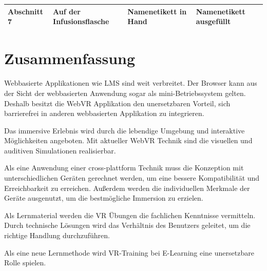 \begin{table}[]
{\begin{tabular}{llll}
Abschnitt 7 & Auf der Infusionsflasche                                                         & Namenetikett in Hand                                                                                     & Namenetikett ausgefüllt                                                                                  \\ \hline
\end{tabular}
}
\label{tab:HinweisBox}
\end{table}

  
\section{Zusammenfassung}
Webbasierte Applikationen wie LMS sind weit verbreitet. Der Browser kann aus der Sicht der webbasierten Anwendung sogar als mini-Betriebssystem gelten. Deshalb besitzt die WebVR Applikation den unersetzbaren Vorteil, sich barrierefrei in anderen webbasierten Applikation zu integrieren.

Das immersive Erlebnis wird durch die lebendige Umgebung und interaktive Möglichkeiten angeboten. Mit aktueller WebVR Technik sind die visuellen und auditiven Simulationen realisierbar.

Als eine Anwendung einer cross-plattform Technik muss die Konzeption mit unterschiedlichen Geräten gerechnet werden, um eine bessere Kompatibilität und Erreichbarkeit zu erreichen. Außerdem werden die individuellen Merkmale der Geräte ausgenutzt, um die bestmögliche Immersion zu erzielen.

Als Lernmaterial werden die VR Übungen die fachlichen Kenntnisse vermitteln. Durch technische Lösungen wird das Verhältnis des Benutzers geleitet, um die richtige Handlung durchzuführen.

Als eine neue Lernmethode wird VR-Training bei E-Learning eine unersetzbare Rolle spielen.

